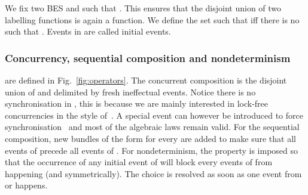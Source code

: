 \documentclass{llncs}
\newcommand{\<}{\langle}
\renewcommand{\>}{\rangle}
\begin{document}
We fix two BES   and  such that . This ensures that the disjoint union of two labelling functions is again a function. We define the set  such that  iff there is no  such that . Events in  are called initial events.

\subsubsection*{Concurrency, sequential composition and nondeterminism~\cite{Kat96}} are defined in Fig.~\ref{fig:operators}. The concurrent composition  is the disjoint union of  and  delimited by fresh ineffectual events. Notice there is no synchronisation in , this is because we are mainly interested in lock-free concurrencies in the style of~\cite{Hoa09,Jon12,Jon81,Din02}. A special event can however be introduced to force synchronisation~\cite{Kat96,Gor97} and most of the algebraic laws remain valid. For the sequential composition, new bundles of the form  for every  are added to make sure that all events of  precede all events of . For nondeterminism, the property  is imposed so that the occurrence of any initial event of  will block every events of  from happening (and symmetrically). The choice is resolved as soon as one event from  or  happens.
\end{document}
